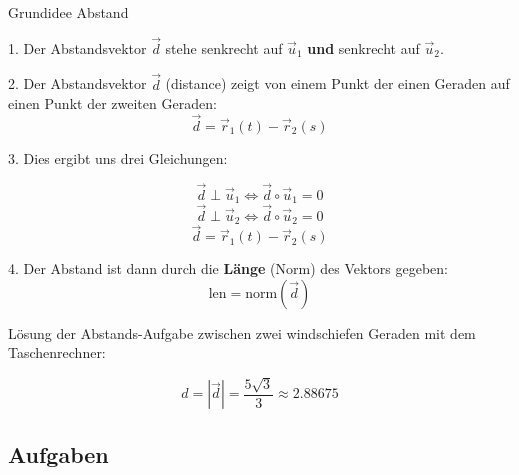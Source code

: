 \begin{rezept}{Grundidee Abstand}{}

  1. Der Abstandsvektor $\vec{d}$ stehe senkrecht auf $\vec{u}_1$
  \textbf{und} senkrecht auf $\vec{u}_2$.

  2. Der Abstandsvektor $\vec{d}$ (distance) zeigt von einem Punkt der einen Geraden auf
  einen Punkt der zweiten Geraden: $$\vec{d}=\vec{r}_1(t) - \vec{r}_2(s)$$

  3. Dies ergibt uns drei Gleichungen:

  $$\vec{d}\perp\vec{u}_1 \Longleftrightarrow{}  \vec{d}\circ{}\vec{u}_1 = 0$$
  $$\vec{d}\perp\vec{u}_2 \Longleftrightarrow{}  \vec{d}\circ{}\vec{u}_2 = 0$$
  $$\vec{d}=\vec{r}_1(t)-\vec{r}_2(s)$$

  4. Der Abstand ist dann durch die \textbf{Länge} (Norm) des Vektors gegeben:
  $$\text{len} = \text{norm}(\vec{d})$$
  
\end{rezept}
\newpage


Lösung der Abstands-Aufgabe zwischen zwei windschiefen Geraden mit dem
Taschenrechner:
\TRAINER{}


$$d = |\vec{d} | = \frac{5\sqrt{3}}{3} \approx 2.88675$$
\newpage

\subsection*{Aufgaben}




